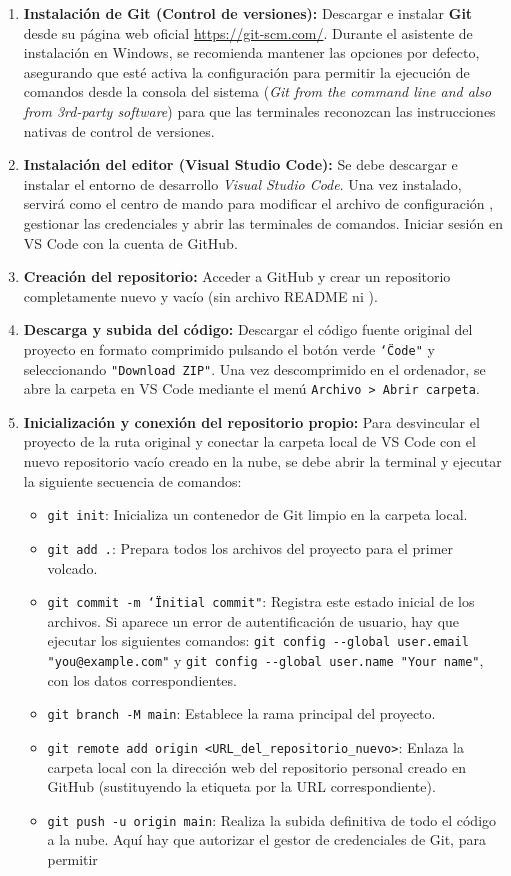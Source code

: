 \begin{enumerate}
\item \textbf{Instalación de Git (Control de versiones):} Descargar e instalar \textbf{Git} desde su página web oficial \url{https://git-scm.com/}. Durante el asistente de instalación en Windows, se recomienda mantener las opciones por defecto, asegurando que esté activa la configuración para permitir la ejecución de comandos desde la consola del sistema (\textit{Git from the command line and also from 3rd-party software}) para que las terminales reconozcan las instrucciones nativas de control de versiones.
\item \textbf{Instalación del editor (Visual Studio Code):} Se debe descargar e instalar el entorno de desarrollo \textit{Visual Studio Code}. Una vez instalado, servirá como el centro de mando para modificar el archivo de configuración , gestionar las credenciales y abrir las terminales de comandos. Iniciar sesión en VS Code con la cuenta de GitHub.
\item \textbf{Creación del repositorio:} Acceder a GitHub y crear un repositorio completamente nuevo y vacío (sin archivo README ni ).
    \item \textbf{Descarga y subida del código:} Descargar el código fuente original del proyecto en formato comprimido pulsando el botón verde \texttt{\char`\"Code"} y seleccionando \texttt{"Download ZIP"}. Una vez descomprimido en el ordenador, se abre la carpeta en VS Code mediante el menú \texttt{Archivo > Abrir carpeta}.
    \item \textbf{Inicialización y conexión del repositorio propio:} Para desvincular el proyecto de la ruta original y conectar la carpeta local de VS Code con el nuevo repositorio vacío creado en la nube, se debe abrir la terminal y ejecutar la siguiente secuencia de comandos:
    \begin{itemize}
        \item \texttt{git init}: Inicializa un contenedor de Git limpio en la carpeta local.
        \item \texttt{git add .}: Prepara todos los archivos del proyecto para el primer volcado.
        \item \texttt{git commit -m \char`\"Initial commit"}: Registra este estado inicial de los archivos. Si aparece un error de autentificación de usuario, hay que ejecutar los siguientes comandos: \texttt{git config -{}-global user.email "you@example.com"} y \texttt{git config -{}-global user.name "Your name"}, con los datos correspondientes.
        \item \texttt{git branch -M main}: Establece la rama principal del proyecto.
        \item \texttt{git remote add origin <URL\_del\_repositorio\_nuevo>}: Enlaza la carpeta local con la dirección web del repositorio personal creado en GitHub (sustituyendo la etiqueta por la URL correspondiente).
        \item \texttt{git push -u origin main}: Realiza la subida definitiva de todo el código a la nube. Aquí hay que autorizar el gestor de credenciales de Git, para permitir 
    \end{itemize}
\end{enumerate}

